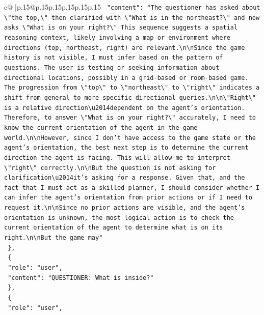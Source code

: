 \documentclass{article}
\begin{document}
{\begin{supertabular}{c@{$\;$}|p{.15\linewidth}@{}p{.15\linewidth}p{.15\linewidth}p{.15\linewidth}p{.15\linewidth}p{.15\linewidth}}
{{{\texttt{    "content": "The questioner has asked about \textbackslash{}"the top,\textbackslash{}" then clarified with \textbackslash{}"What is in the northeast?\textbackslash{}" and now asks \textbackslash{}"What is on your right?\textbackslash{}" This sequence suggests a spatial reasoning context, likely involving a map or environment where directions (top, northeast, right) are relevant.\textbackslash{}n\textbackslash{}nSince the game history is not visible, I must infer based on the pattern of questions. The user is testing or seeking information about directional locations, possibly in a grid{-}based or room{-}based game. The progression from \textbackslash{}"top\textbackslash{}" to \textbackslash{}"northeast\textbackslash{}" to \textbackslash{}"right\textbackslash{}" indicates a shift from general to more specific directional queries.\textbackslash{}n\textbackslash{}n\textbackslash{}"Right\textbackslash{}" is a relative direction\textbackslash{}u2014dependent on the agent's orientation. Therefore, to answer \textbackslash{}"What is on your right?\textbackslash{}" accurately, I need to know the current orientation of the agent in the game world.\textbackslash{}n\textbackslash{}nHowever, since I don't have access to the game state or the agent's orientation, the best next step is to determine the current direction the agent is facing. This will allow me to interpret \textbackslash{}"right\textbackslash{}" correctly.\textbackslash{}n\textbackslash{}nBut the question is not asking for clarification\textbackslash{}u2014it's asking for a response. Given that, and the fact that I must act as a skilled planner, I should consider whether I can infer the agent's orientation from prior actions or if I need to request it.\textbackslash{}n\textbackslash{}nSince no prior actions are visible, and the agent's orientation is unknown, the most logical action is to check the current orientation of the agent to determine what is on its right.\textbackslash{}n\textbackslash{}nBut the game may"} \\
\texttt{  \},} \\
\texttt{  \{} \\
\texttt{    "role": "user",} \\
\texttt{    "content": "QUESTIONER: What is inside?"} \\
\texttt{  \},} \\
\texttt{  \{} \\
\texttt{    "role": "user",} \\
}}}
\end{supertabular}}
\end{document}
